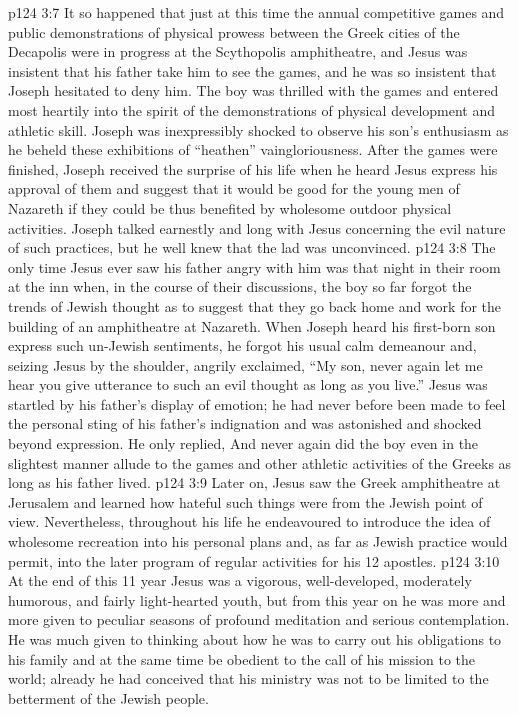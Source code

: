 \vs p124 3:7 It so happened that just at this time the annual competitive games and public demonstrations of physical prowess between the Greek cities of the Decapolis were in progress at the Scythopolis amphitheatre, and Jesus was insistent that his father take him to see the games, and he was so insistent that Joseph hesitated to deny him. The boy was thrilled with the games and entered most heartily into the spirit of the demonstrations of physical development and athletic skill. Joseph was inexpressibly shocked to observe his son’s enthusiasm as he beheld these exhibitions of “heathen” vaingloriousness. After the games were finished, Joseph received the surprise of his life when he heard Jesus express his approval of them and suggest that it would be good for the young men of Nazareth if they could be thus benefited by wholesome outdoor physical activities. Joseph talked earnestly and long with Jesus concerning the evil nature of such practices, but he well knew that the lad was unconvinced.
\vs p124 3:8 The only time Jesus ever saw his father angry with him was that night in their room at the inn when, in the course of their discussions, the boy so far forgot the trends of Jewish thought as to suggest that they go back home and work for the building of an amphitheatre at Nazareth. When Joseph heard his first\hyp{}born son express such un\hyp{}Jewish sentiments, he forgot his usual calm demeanour and, seizing Jesus by the shoulder, angrily exclaimed, “My son, never again let me hear you give utterance to such an evil thought as long as you live.” Jesus was startled by his father’s display of emotion; he had never before been made to feel the personal sting of his father’s indignation and was astonished and shocked beyond expression. He only replied,  And never again did the boy even in the slightest manner allude to the games and other athletic activities of the Greeks as long as his father lived.
\vs p124 3:9 Later on, Jesus saw the Greek amphitheatre at Jerusalem and learned how hateful such things were from the Jewish point of view. Nevertheless, throughout his life he endeavoured to introduce the idea of wholesome recreation into his personal plans and, as far as Jewish practice would permit, into the later program of regular activities for his 12 apostles.
\vs p124 3:10 At the end of this 11 year Jesus was a vigorous, well\hyp{}developed, moderately humorous, and fairly light\hyp{}hearted youth, but from this year on he was more and more given to peculiar seasons of profound meditation and serious contemplation. He was much given to thinking about how he was to carry out his obligations to his family and at the same time be obedient to the call of his mission to the world; already he had conceived that his ministry was not to be limited to the betterment of the Jewish people.
